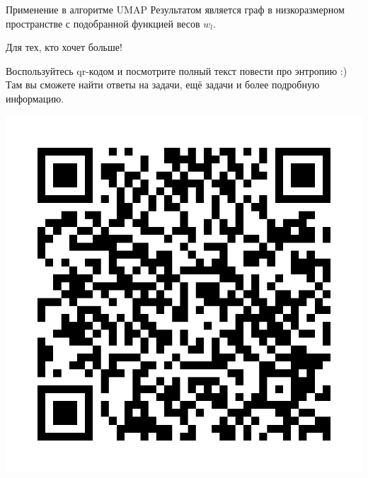 \documentclass[final]{beamer}
\newlength{\onecolwid}
\begin{document}
\begin{frame}[t]
\begin{columns}[t]
\begin{column}{\onecolwid}
\begin{block}{Применение в алгоритме UMAP}
Результатом является граф в низкоразмерном пространстве с подобранной функцией весов $w_l$.
\end{block}






\begin{block}{Для тех, кто хочет больше!}

Воспользуйтесь qr-кодом и посмотрите полный текст повести про энтропию :) Там вы сможете найти ответы на задачи, ещё задачи и более подробную информацию.

\begin{center}
	\includegraphics[scale=0.3]{qrcode.png}
\end{center}


\end{block}
\end{column}
\end{columns}
\end{frame}
\end{document}

